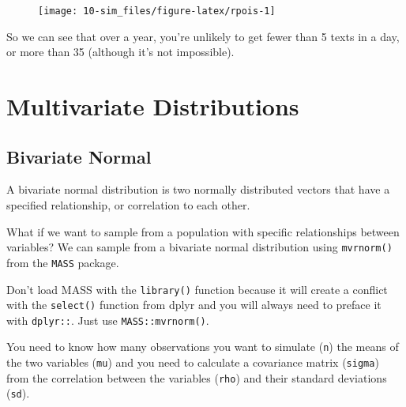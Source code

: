 \documentclass[
  oneside]{book}
\begin{document}
\begin{figure}

{\centering \texttt{[image: 10-sim\_files/figure-latex/rpois-1]} 

}

\end{figure}

So we can see that over a year, you're unlikely to get fewer than 5 texts in a day, or more than 35 (although it's not impossible).

\hypertarget{mvdist}{%
\section{Multivariate Distributions}\label{mvdist}}

\hypertarget{bvn}{%
\subsection{Bivariate Normal}\label{bvn}}

A bivariate normal distribution is two normally distributed vectors that have a specified relationship, or correlation to each other.

What if we want to sample from a population with specific relationships between variables? We can sample from a bivariate normal distribution using \texttt{mvrnorm()} from the \texttt{MASS} package.

\begin{warning}
Don't load MASS with the \texttt{library()} function because it will create a conflict with the \texttt{select()} function from dplyr and you will always need to preface it with \texttt{dplyr::}. Just use \texttt{MASS::mvrnorm()}.

\end{warning}

You need to know how many observations you want to simulate (\texttt{n}) the means of the two variables (\texttt{mu}) and you need to calculate a covariance matrix (\texttt{sigma}) from the correlation between the variables (\texttt{rho}) and their standard deviations (\texttt{sd}).
\end{document}
